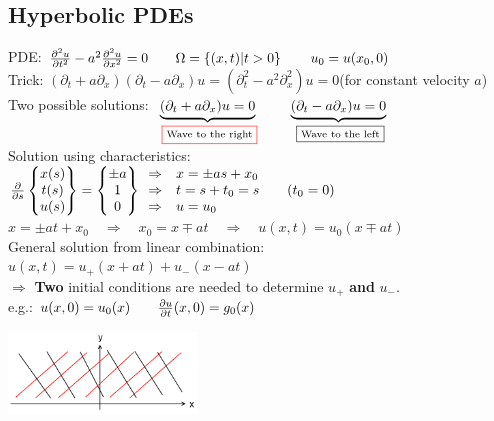 
\subsection{Hyperbolic PDEs}
\begin{minipage}{14cm}
PDE: $\frac{\partial ^2u}{\partial t^2}-a^2\frac{\partial ^2 u}{\partial x^2}=0\qquad \Omega=\left\{(x,t)|t>0\right\}\qquad u_0=u(x_0,0)$\\

Trick: $(\partial_t +a\partial_x)(\partial_t-a\partial_x)u=(\partial_t^2-a^2\partial_x^2)u=0$\qquad(for constant velocity $a$)\\

Two possible solutions: $\underset{\text{\cfbox{red}{Wave to the right}}}{\underbrace{(\partial_t +a\partial_x)u=0}}\qquad \underset{\text{\cfbox{black}{Wave to the left}}}{\underbrace{(\partial_t-a\partial_x)u=0}}$\\

Solution using characteristics: $\frac{\partial }{\partial s}
\begin{Bmatrix}
	x(s)\\
	t(s)\\
	u(s)
\end{Bmatrix}=
\begin{Bmatrix}
	\pm a\\
	1\\
	0
\end{Bmatrix}
\begin{array}{ll}
	\Rightarrow&x=\pm as +x_0\\
	\Rightarrow&t= s +t_0=s\qquad (t_0=0)\\
	\Rightarrow&u=u_0\\
\end{array}
$\\

$x=\pm at+x_0\quad\Rightarrow\quad x_0=x\mp at\quad\Rightarrow\quad u(x,t)=u_0(x\mp at)$\\

General solution from linear combination: $\boxed{u(x,t)=u_+(x+at)+u_-(x-at)}$\\

$\Rightarrow$ \textbf{Two} initial conditions are needed to determine $u_+$ \textbf{and} $u_-$.\\

e.g.: $u(x,0)=u_0(x)\qquad \frac{\partial u}{\partial t}(x,0)=g_0(x)$
\end{minipage}
\hfill
\begin{minipage}{5cm}
\includegraphics[width=5cm]{Content/01_theory/linksRechts}
\end{minipage}
